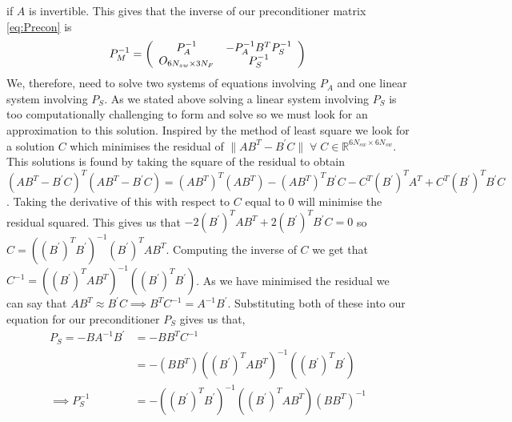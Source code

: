 if $A$ is invertible. This gives that the inverse of our preconditioner matrix \cref{eq:Precon} is
\begin{equation*}
\def\arraystretch{0.8}
        P_M^{-1} = \left(\begin{array}{cc}
        P_A^{-1} & -P_A^{-1} B^T P_S^{-1} \\
        O_{6N_{sw}\times3N_F} & P_S^{-1}
    \end{array}\right)
\end{equation*}
We, therefore, need to solve two systems of equations involving $P_A$ and one linear system involving $P_S$. As we stated above solving a linear system involving $P_S$ is too computationally challenging to form and solve so we must look for an approximation to this solution. Inspired by the method of least square we look for a solution $C$ which minimises the residual of $\lVert AB^T - B^\prime C \rVert \;\forall\; C \in \mathbb{R}^{6N_{sw}\times6N_{sw}}$. This solutions is found by taking the square of the residual to obtain $(AB^T - B^\prime C)^T(AB^T - B^\prime C) = (AB^T)^T(AB^T)-(AB^T)^TB^\prime C-C^T(B^\prime)^TA^T + C^T(B^\prime)^TB^\prime C$. Taking the derivative of this with respect to $C$ equal to $0$ will minimise the residual squared. This gives us that $-2(B^\prime)^TAB^T + 2(B^\prime)^TB^\prime C=0$ so $C = ((B^\prime)^TB^\prime)^{-1}(B^\prime)^TAB^T$. Computing the inverse of $C$ we get that $C^{-1} = ((B^\prime)^TAB^T)^{-1}((B^\prime)^TB^\prime)$. As we have minimised the residual we can say that $AB^T \approx B^\prime C \implies B^T C^{-1} = A^{-1}B^\prime$. Substituting both of these into our equation for our preconditioner $P_S$ gives us that, 
\begin{equation}
\begin{aligned}
    P_S = - B A^{-1}B^\prime &= -B B^{T} C^{-1} \\
    & = -(B B^{T})((B^\prime)^TAB^T)^{-1}((B^\prime)^TB^\prime) \\
    \implies P_S^{-1} &= -((B^\prime)^TB^\prime)^{-1}((B^\prime)^TAB^T)(B B^{T})^{-1}
\end{aligned}
\label{eq:PreconS}
\end{equation}
